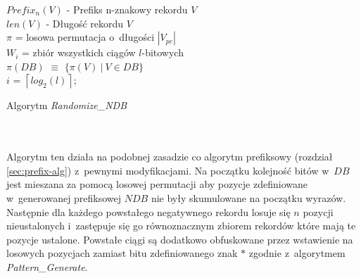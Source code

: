 \begin{algorithm}[H]
    \SetAlgoLined
    $Prefix_n(V)$ - Prefiks n-znakowy rekordu $V$\\
    $len(V)$ - Długość rekordu $V$\\
    $\pi$ = losowa permutacja o~długości $|V_{pe}|$\\
    $W_i$ = zbiór wszystkich ciągów $l$-bitowych\\
    $\pi(DB)$ $\equiv$ $\{\pi(V) ~|~ V \in DB\}$\\
    $i$ = $\left \lceil{log_2(l)}\right \rceil$;\\
    \caption{Algorytm \textit{Randomize\_NDB}}
    \label{alg:randomize}
\end{algorithm}
~\\\\
Algorytm ten działa na podobnej zasadzie co algorytm prefiksowy (rozdział \ref{sec:prefix-alg}) z~pewnymi modyfikacjami.
Na początku kolejność bitów w~$DB$ jest mieszana za pomocą losowej permutacji aby pozycje zdefiniowane w~generowanej prefiksowej $NDB$ nie były skumulowane na początku wyrazów. Następnie dla każdego powstałego negatywnego rekordu losuje się $n$ pozycji nieustalonych i~zastępuje się go równoznacznym zbiorem rekordów które mają te pozycje ustalone. 
Powstałe ciągi są dodatkowo obfuskowane przez wstawienie na losowych pozycjach zamiast bitu zdefiniowanego znak $*$ zgodnie z~algorytmem \textit{Pattern\_Generate}.

